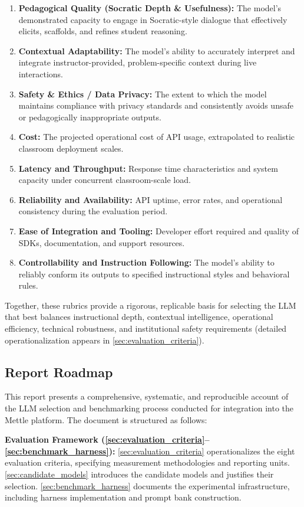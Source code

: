 \begin{enumerate}[leftmargin=*]
    \item \textbf{Pedagogical Quality (Socratic Depth \& Usefulness):} The model's demonstrated capacity to engage in Socratic-style dialogue that effectively elicits, scaffolds, and refines student reasoning.
    \item \textbf{Contextual Adaptability:} The model's ability to accurately interpret and integrate instructor-provided, problem-specific context during live interactions.
    \item \textbf{Safety \& Ethics / Data Privacy:} The extent to which the model maintains compliance with privacy standards and consistently avoids unsafe or pedagogically inappropriate outputs.
    \item \textbf{Cost:} The projected operational cost of API usage, extrapolated to realistic classroom deployment scales.
    \item \textbf{Latency and Throughput:} Response time characteristics and system capacity under concurrent classroom-scale load.
    \item \textbf{Reliability and Availability:} API uptime, error rates, and operational consistency during the evaluation period.
    \item \textbf{Ease of Integration and Tooling:} Developer effort required and quality of SDKs, documentation, and support resources.
    \item \textbf{Controllability and Instruction Following:} The model's ability to reliably conform its outputs to specified instructional styles and behavioral rules.
\end{enumerate}

Together, these rubrics provide a rigorous, replicable basis for selecting the LLM that best balances instructional depth, contextual intelligence, operational efficiency, technical robustness, and institutional safety requirements (detailed operationalization appears in \cref{sec:evaluation_criteria}).

\subsection{Report Roadmap}
This report presents a comprehensive, systematic, and reproducible account of the LLM selection and benchmarking process conducted for integration into the Mettle platform. The document is structured as follows:

\textbf{Evaluation Framework (\cref{sec:evaluation_criteria}--\cref{sec:benchmark_harness}):} \cref{sec:evaluation_criteria} operationalizes the eight evaluation criteria, specifying measurement methodologies and reporting units. \cref{sec:candidate_models} introduces the candidate models and justifies their selection. \cref{sec:benchmark_harness} documents the experimental infrastructure, including harness implementation and prompt bank construction.

